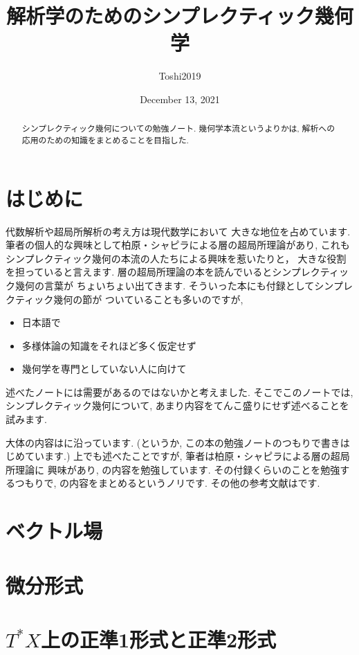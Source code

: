 \documentclass[12pt,leqno]{article}
\theoremstyle{definition}
\numberwithin{equation}{subsection}
\begin{document}
\title{解析学のためのシンプレクティック幾何学}
\author{Toshi2019}

\date{December 13, 2021}

\maketitle
\begin{abstract}
シンプレクティック幾何についての勉強ノート. 
幾何学本流というよりかは, 
解析への応用のための知識をまとめることを目指した. 
\end{abstract}

\tableofcontents
\section*{はじめに}

代数解析や超局所解析の考え方は現代数学において
大きな地位を占めています. 
筆者の個人的な興味として柏原・シャピラによる層の超局所理論があり, 
これもシンプレクティック幾何の本流の人たちによる興味を惹いたりと，
大きな役割を担っていると言えます. 
層の超局所理論の本を読んでいるとシンプレクティック幾何の言葉が
ちょいちょい出てきます. 
そういった本にも付録としてシンプレクティック幾何の節が
ついていることも多いのですが, \begin{itemize}
    \item 日本語で
    \item 多様体論の知識をそれほど多く仮定せず
    \item 幾何学を専門としていない人に向けて
\end{itemize}
述べたノートには需要があるのではないかと考えました. 
そこでこのノートでは, シンプレクティック幾何について, 
あまり内容をてんこ盛りにせず述べることを試みます. 

大体の内容は\cite[Chap 3]{Dui96}に沿っています. 
(というか, この本の勉強ノートのつもりで書きはじめています.)
上でも述べたことですが, 筆者は柏原・シャピラによる層の超局所理論に
興味があり, \cite{KS90}の内容を勉強しています. 
その付録くらいのことを勉強するつもりで, 
\cite[Chap 3]{Dui96}の内容をまとめるというノリです. 
その他の参考文献は\cite{HTT08}です. 

\section{ベクトル場}
\section{微分形式}
\section{$T^{\ast}X$上の正準1形式と正準2形式}
\end{document}
